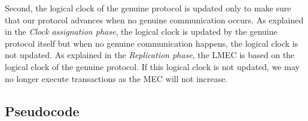 \documentclass[a4paper, 10pt]{article}
\begin{document}
\begin{description}
        Second, the logical clock of the genuine protocol is updated only to make sure that our protocol advances when
        no genuine communication occurs. As explained in the \textit{Clock assignation phase}, the logical clock
        is updated by the genuine protocol itself but when no genuine communication happens, the logical clock is not updated.
        As explained in the \textit{Replication phase}, the LMEC is based on the logical clock of the genuine protocol.
        If this logical clock is not updated, we may no longer execute transactions as the MEC will not increase.

\end{description}

\subsection{Pseudocode}
\end{document}
